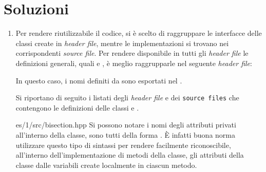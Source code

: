 \section*{Soluzioni}

\begin{enumerate}

    \item Per rendere riutilizzabile il codice, si \`e scelto di raggruppare le
        interfacce delle classi create in \emph{header file}, mentre le
        implementazioni si trovano nei corrispondenti \emph{source
        file}. Per rendere disponibile in tutti gli \emph{header file} le
        definizioni generali, quali  e , \`e meglio
        raggrupparle nel seguente \emph{header file}:

        \lstset{basicstyle=\scriptsize\sf}
            
        \lstset{basicstyle=\sf}

        In questo caso, i nomi definiti da  sono
        esportati nel  .

        Si riportano di seguito i listati degli \emph{header file} e dei
        \texttt{source files} che contengono le definizioni delle classi
         e .
        \lstset{basicstyle=\scriptsize\sf}
            
                {es/1/src/bisection.hpp}
        \lstset{basicstyle=\sf}
        Si possono notare i nomi degli attributi privati all'interno della classe,
        sono tutti della forma .
        \`E infatti buona norma utilizzare questo tipo di sintassi per rendere
        facilmente riconoscibile, all'interno dell'implementazione di metodi della classe,
        gli attributi della classe dalle variabili create localmente in ciascun metodo.


\end{enumerate}
